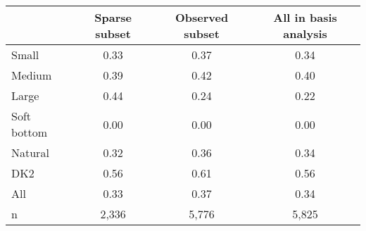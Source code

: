 \begin{tabular}{lccc}
\toprule
 & Sparse subset & Observed subset & All in basis analysis \\
\midrule
Small & 0.33 & 0.37 & 0.34 \\
Medium & 0.39 & 0.42 & 0.40 \\
Large & 0.44 & 0.24 & 0.22 \\
Soft bottom & 0.00 & 0.00 & 0.00 \\
Natural & 0.32 & 0.36 & 0.34 \\
DK2 & 0.56 & 0.61 & 0.56 \\
All & 0.33 & 0.37 & 0.34 \\
n & 2,336 & 5,776 & 5,825 \\
\bottomrule
\end{tabular}
